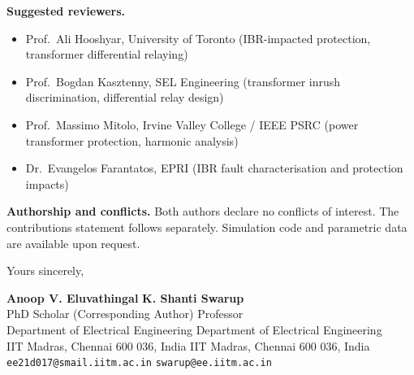 \documentclass[11pt,a4paper]{article}
\begin{document}
\medskip\noindent\textbf{Suggested reviewers.}
\begin{itemize}
  \item Prof.\ Ali Hooshyar, University of Toronto (IBR-impacted protection,
        transformer differential relaying)
  \item Prof.\ Bogdan Kasztenny, SEL Engineering (transformer inrush
        discrimination, differential relay design)
  \item Prof.\ Massimo Mitolo, Irvine Valley College / IEEE PSRC
        (power transformer protection, harmonic analysis)
  \item Dr.\ Evangelos Farantatos, EPRI (IBR fault characterisation and
        protection impacts)
\end{itemize}

\medskip\noindent\textbf{Authorship and conflicts.}
Both authors declare no conflicts of interest.
The contributions statement follows separately.
Simulation code and parametric data are available upon request.

\bigskip

\noindent Yours sincerely,

\bigskip\bigskip

\noindent
\textbf{Anoop V. Eluvathingal} \hfill \textbf{K. Shanti Swarup}\\
PhD Scholar (Corresponding Author) \hfill Professor\\
Department of Electrical Engineering \hfill Department of Electrical
Engineering\\
IIT Madras, Chennai 600 036, India \hfill IIT Madras, Chennai 600 036,
India\\
\texttt{ee21d017@smail.iitm.ac.in} \hfill
\texttt{swarup@ee.iitm.ac.in}
\end{document}
